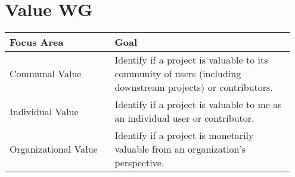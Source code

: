 

\section{Value WG}
\begin{table}[ht!]
    \centering
    \begin{tabular}{|p{0.35\linewidth} | p{0.6\linewidth}|}
        \hline
        \hfil \textbf{Focus Area}  & \hfil \textbf{Goal} \\
        \hline
		Communal Value & Identify if a project is valuable to its community of users (including downstream projects) or contributors. \\ 
		\hline
		Individual Value & Identify if a project is valuable to me as an individual user or contributor. \\ 
		\hline
		Organizational Value & Identify if a project is monetarily valuable from an organization's perspective. \\ 
		\hline
    \end{tabular}
\end{table}

\clearpage
 
 
 
